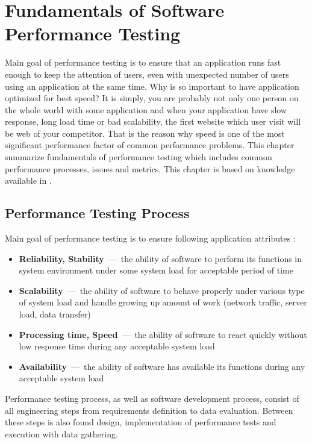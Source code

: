 
\chapter{Fundamentals of Software Performance Testing}
\label{Fundamentals of Software Performance Testing}
Main goal of performance testing is to ensure that an application runs fast enough to keep the attention of users, even with unexpected number of users using an application at the same time. Why is so important to have application optimized for best speed? It is simply, you are probably not only one person on the whole world with some application and when your application have slow response, long load time or bad scalability, the first website which user visit will be web of your competitor. That is the reason why speed is one of the most significant performance factor of common performance problems. This chapter summarize fundamentals of performance testing which includes common performance processes, issues and metrics. This chapter is based on knowledge available in \cite{Molyneaux:TAoAPT, Kurkova:Thesis:2017, DIN:PHD}.


\section{Performance Testing Process}
\label{Performance Testing Process}
Main goal of performance testing is to ensure following application attributes \cite{GAO:MEASURING}:

\begin{itemize}
	\setlength\itemsep{0em}
	\item \textbf{Reliability, Stability} \,---\ the ability of software to perform its functions in system environment under some system load for acceptable period of time
	\item \textbf{Scalability} \,---\ the ability of software to behave properly under various type of system load and handle growing up amount of work (network traffic, server load, data transfer)
	\item \textbf{Processing time, Speed} \,---\ the ability of software to react quickly without low response time during any acceptable system load
	\item \textbf{Availability} \,---\ the ability of software has available its functions during any acceptable system load
\end{itemize}

Performance testing process, as well as software development process, consist of all engineering steps from requirements definition to data evaluation. Between these steps is also found design, implementation of performance tests and execution with data gathering. 
\\

